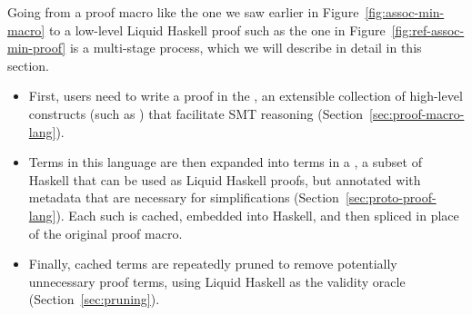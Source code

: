 % 
% 
  


Going from a proof macro like the one we saw earlier in
Figure~\ref{fig:assoc-min-macro} to a low-level Liquid Haskell proof
such as the one in Figure~\ref{fig:ref-assoc-min-proof} is a
multi-stage process, which we will describe in detail in this section.

\begin{itemize}
\item First, users need to write a proof in the \LangA, an extensible
  collection of high-level constructs (such as ) that
  facilitate SMT reasoning (Section~\ref{sec:proof-macro-lang}).
\item Terms in this language are then expanded into terms in a \LangB,
  a subset of Haskell that can be used as Liquid Haskell proofs, but
  annotated with metadata that are necessary for simplifications
  (Section~\ref{sec:proto-proof-lang}). Each such \LangBTerm is cached,
  embedded into Haskell, and then spliced in place of the original
  proof macro.
\item Finally, cached terms are repeatedly pruned to remove
  potentially unnecessary proof terms, using Liquid Haskell as the
  validity oracle (Section~\ref{sec:pruning}).
  
\end{itemize}

% 
%  
